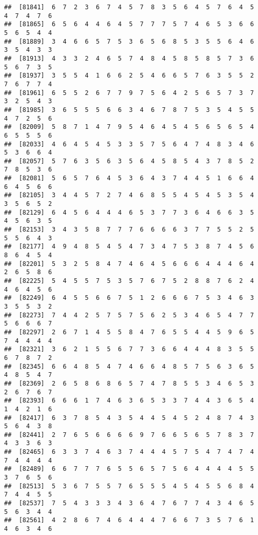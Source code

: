\documentclass[
]{book}
\begin{document}
\begin{verbatim}
##  [81841]  6  7  2  3  6  7  4  5  7  8  3  5  6  4  5  7  6  4  5  4  7  4  7  6
##  [81865]  6  5  6  4  4  6  4  5  7  7  7  5  7  4  6  5  3  6  6  5  6  5  4  4
##  [81889]  3  4  6  6  5  7  5  3  6  5  6  8  5  3  5  5  6  4  6  3  5  4  3  3
##  [81913]  4  3  3  2  4  6  5  7  4  8  4  5  8  5  8  5  7  3  6  5  6  7  3  5
##  [81937]  3  5  5  4  1  6  6  2  5  4  6  6  5  7  6  3  5  5  2  7  6  7  7  4
##  [81961]  6  5  5  2  6  7  7  9  7  5  6  4  2  5  6  5  7  3  7  3  2  5  4  3
##  [81985]  3  6  5  5  5  6  6  3  4  6  7  8  7  5  3  5  4  5  5  4  7  2  5  6
##  [82009]  5  8  7  1  4  7  9  5  4  6  4  5  4  5  6  5  6  5  4  6  5  5  5  6
##  [82033]  4  6  4  5  4  5  3  3  5  7  5  6  4  7  4  8  3  4  6  5  3  6  6  4
##  [82057]  5  7  6  3  5  6  3  5  6  4  5  8  5  4  3  7  8  5  2  7  8  5  3  6
##  [82081]  5  6  5  7  6  4  5  3  6  4  3  7  4  4  5  1  6  6  4  6  4  5  6  6
##  [82105]  3  4  4  5  7  2  7  4  6  8  5  5  4  5  4  5  3  5  4  3  5  6  5  2
##  [82129]  6  4  5  6  4  4  4  6  5  3  7  7  3  6  4  6  6  3  5  4  5  6  3  5
##  [82153]  3  4  3  5  8  7  7  7  6  6  6  6  3  7  7  5  5  2  5  5  5  6  4  3
##  [82177]  4  9  4  8  5  4  5  4  7  3  4  7  5  3  8  7  4  5  6  8  6  4  5  4
##  [82201]  5  3  2  5  8  4  7  4  6  4  5  6  6  6  4  4  4  6  4  2  6  5  8  6
##  [82225]  5  4  5  5  7  5  3  5  7  6  7  5  2  8  8  7  6  2  4  4  6  4  5  6
##  [82249]  6  4  5  5  6  6  7  5  1  2  6  6  6  7  5  3  4  6  3  3  5  5  3  2
##  [82273]  7  4  4  2  5  7  5  7  5  6  2  5  3  4  6  5  4  7  7  5  6  6  6  7
##  [82297]  2  6  7  1  4  5  5  8  4  7  6  5  5  4  4  5  9  6  5  7  4  4  4  4
##  [82321]  3  6  2  1  5  5  6  7  7  3  6  6  4  4  4  8  3  5  5  6  7  8  7  2
##  [82345]  6  6  4  8  5  4  7  4  6  6  4  8  5  7  5  6  3  6  5  4  8  5  4  7
##  [82369]  2  6  5  8  6  8  6  5  7  4  7  8  5  5  3  4  6  5  3  2  6  7  6  7
##  [82393]  6  6  6  1  7  4  6  3  6  5  3  3  7  4  4  3  6  5  4  1  4  2  1  6
##  [82417]  6  3  7  8  5  4  3  5  4  4  5  4  5  2  4  8  7  4  3  5  6  4  3  8
##  [82441]  2  7  6  5  6  6  6  6  9  7  6  6  5  6  5  7  8  3  7  4  3  3  6  3
##  [82465]  6  3  3  7  4  6  3  7  4  4  4  5  7  5  4  7  4  7  4  7  4  4  4  4
##  [82489]  6  6  7  7  7  6  5  5  6  5  7  5  6  4  4  4  4  5  5  3  7  6  5  6
##  [82513]  5  3  6  7  5  5  7  6  5  5  5  4  5  4  5  5  6  8  4  7  4  4  5  5
##  [82537]  7  5  4  3  3  3  4  3  6  4  7  6  7  7  4  3  4  6  5  5  6  3  4  4
##  [82561]  4  2  8  6  7  4  6  4  4  4  7  6  6  7  3  5  7  6  1  4  6  3  4  6

\end{verbatim}
\end{document}

